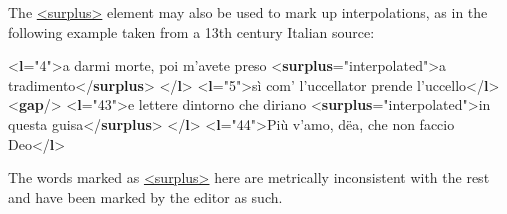 The \hyperref[TEI.surplus]{<surplus>} element may also be used to mark up interpolations, as in the following example taken from a 13th century Italian source: \par\bgroup{}\exampleFont \begin{shaded}\noindent\mbox{}{<\textbf{l}\hspace*{1em}{n}="{4}">}a darmi morte, poi m'avete preso {<\textbf{surplus}\hspace*{1em}{reason}="{interpolated}">}a\mbox{}\newline 
\hspace*{1em}\hspace*{1em} tradimento{</\textbf{surplus}>}\mbox{}\newline 
{</\textbf{l}>}\mbox{}\newline 
{<\textbf{l}\hspace*{1em}{n}="{5}">}sì com' l'uccellator prende l'uccello{</\textbf{l}>}\mbox{}\newline 
{<\textbf{gap}/>}\mbox{}\newline 
{<\textbf{l}\hspace*{1em}{n}="{43}">}e lettere dintorno che diriano {<\textbf{surplus}\hspace*{1em}{reason}="{interpolated}">}in questa\mbox{}\newline 
\hspace*{1em}\hspace*{1em} guisa{</\textbf{surplus}>}\mbox{}\newline 
{</\textbf{l}>}\mbox{}\newline 
{<\textbf{l}\hspace*{1em}{n}="{44}">}Più v'amo, dëa, che non faccio Deo{</\textbf{l}>}\end{shaded}\egroup\par \noindent  The words marked as \hyperref[TEI.surplus]{<surplus>} here are metrically inconsistent with the rest and have been marked by the editor as such.\par
